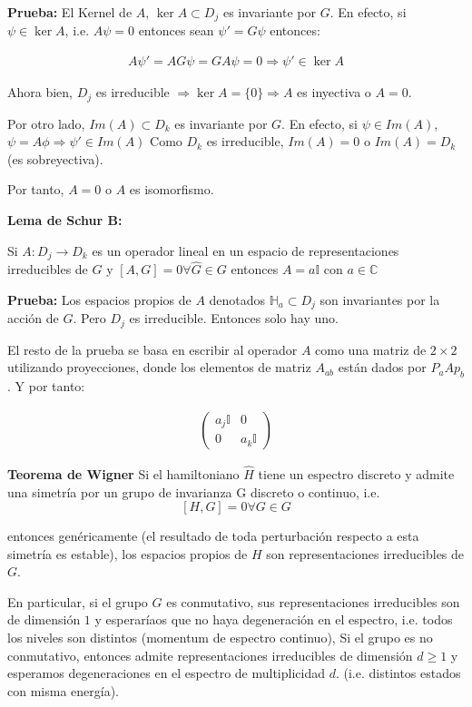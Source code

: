 \textbf{Prueba:} El Kernel de $A$, $\ker A\subset D_j$ es invariante por $G$. En efecto, si $\psi\in\ker A$, i.e. $A\psi=0$ entonces sean $\psi '=G\psi$ entonces:

\begin{align*}
    A\psi ' =AG\psi=GA\psi=0\Rightarrow\psi ' \in\ker A
\end{align*}

Ahora bien, $D_j$ es irreducible $\Rightarrow \ker A=\{0\}\Rightarrow A$ es inyectiva o $A=0$.

Por otro lado, $Im(A)\subset D_k$ es invariante por $G$. En efecto, si $\psi \in Im(A)$, $\psi=A\phi\Rightarrow\psi'\in Im(A)$ Como $D_k$ es irreducible, $Im(A)=0$ o $Im(A)=D_k$ (es sobreyectiva).

Por tanto, $A=0$ o $A$ es isomorfismo.

\textbf{Lema de Schur B:}

Si $A:D_j\rightarrow D_k$ es un operador lineal en un espacio de representaciones irreducibles de $G$ y $\left[A,G\right]=0 \forall \hat{G}\in G$ entonces $A=a\mathbb{I}$ con $a\in \mathbb{C}$

\textbf{Prueba:}
Los espacios propios de $A$ denotados $\mathbb{H}_a\subset D_j$ son invariantes por la acción de $G$. Pero $D_j$ es irreducible. Entonces solo hay uno.

El resto de la prueba se basa en escribir al operador $A$ como una matriz de $2\times 2$ utilizando proyecciones, donde los elementos de matriz $A_{ab}$ están dados por $P_a A p_b$. Y por tanto:

\begin{align*}
    \begin{pmatrix}
        a_j \mathbb{I} & 0\\
        0 & a_k \mathbb{I}
    \end{pmatrix}
\end{align*}


\textbf{Teorema de Wigner}
Si el hamiltoniano $\hat{H}$ tiene un espectro discreto y admite una simetría por un grupo de invarianza G discreto o continuo, i.e.$$\left[H,G\right]=0\forall G\in G$$

entonces genéricamente (el resultado de toda perturbación respecto a esta simetría es estable), los espacios propios de $H$ son representaciones irreducibles de $G$.

En particular, si el grupo $G$ es conmutativo, sus representaciones irreducibles son de dimensión $1$ y esperaríaos que no haya degeneración en el espectro, i.e. todos los niveles son distintos (momentum de espectro continuo),
Si el grupo es no conmutativo, entonces admite representaciones irreducibles de dimensión $d\geq 1$ y esperamos degeneraciones en el espectro de multiplicidad $d$. (i.e. distintos estados con misma energía).

